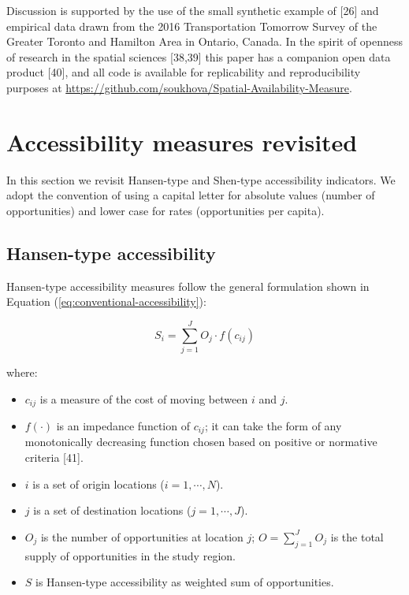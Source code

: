 \documentclass[10pt,letterpaper]{article}
\providecommand{\tightlist}{%
  \setlength{\itemsep}{0pt}\setlength{\parskip}{0pt}}
\begin{document}
Discussion is supported by the use of the small synthetic example of
{[}26{]} and empirical data drawn from the 2016 Transportation Tomorrow
Survey of the Greater Toronto and Hamilton Area in Ontario, Canada. In
the spirit of openness of research in the spatial sciences {[}38,39{]}
this paper has a companion open data product {[}40{]}, and all code is
available for replicability and reproducibility purposes at
\url{https://github.com/soukhova/Spatial-Availability-Measure}.

\hypertarget{background}{%
\section{Accessibility measures revisited}\label{background}}

In this section we revisit Hansen-type and Shen-type accessibility
indicators. We adopt the convention of using a capital letter for
absolute values (number of opportunities) and lower case for rates
(opportunities per capita).

\hypertarget{hansen-type-accessibility}{%
\subsection{Hansen-type accessibility}\label{hansen-type-accessibility}}

Hansen-type accessibility measures follow the general formulation shown
in Equation (\ref{eq:conventional-accessibility}):

\begin{equation}
\label{eq:conventional-accessibility}
S_i = \sum_{j=1}^JO_j \cdot f(c_{ij})
\end{equation}

\noindent where:

\begin{itemize}
\tightlist
\item
  \(c_{ij}\) is a measure of the cost of moving between \(i\) and \(j\).
\item
  \(f(\cdot)\) is an impedance function of \(c_{ij}\); it can take the
  form of any monotonically decreasing function chosen based on positive
  or normative criteria {[}41{]}.
\item
  \(i\) is a set of origin locations (\(i = 1,\cdots,N\)).
\item
  \(j\) is a set of destination locations (\(j = 1,\cdots,J\)).
\item
  \(O_j\) is the number of opportunities at location \(j\);
  \(O = \sum_{j=1}^J O_j\) is the total supply of opportunities in the
  study region.
\item
  \(S\) is Hansen-type accessibility as weighted sum of opportunities.
\end{itemize}
\end{document}
